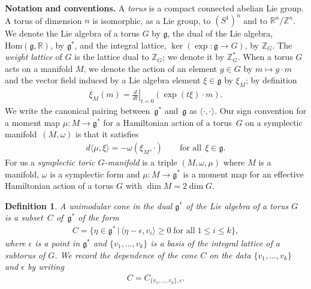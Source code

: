 \documentclass[pdftex]{sigma}
\numberwithin{equation}{section}
\newtheorem{Definition}[Lemma]{Definition}
\begin{document}
\textbf{Notation and conventions.}
A \emph{torus} is a compact connected abelian Lie group.  A torus
of dimension $n$ is isomorphic, as a Lie group, to $(S^1)^n$
and to ${\mathbb R}^n/{\mathbb Z}^n$.  We denote the Lie algebra of a torus $G$ by ${\mathfrak g}$,
the dual of the Lie algebra, $\text{Hom}({\mathfrak g},{\mathbb R})$, by ${\mathfrak g}^*$, and
the integral lattice, $\ker (\exp \colon {\mathfrak g} \to G)$, by ${\mathbb Z}_G$.
The \emph{weight lattice} of $G$ is the lattice dual to ${\mathbb Z}_G$;
we denote it by ${\mathbb Z}_G^*$.
When a torus $G$ acts on a manifold $M$, we denote the action
of an element $g \in G$ by $m \mapsto g \cdot m$ and the vector f\/ield
induced by a Lie algebra element $\xi \in {\mathfrak g}$ by $\xi_M$; by
def\/inition
\begin{gather*}
\xi_M (m) = \left. \frac{d}{dt}\right|_{t=0} (\exp
(t\xi)\cdot m).
\end{gather*}
We write the canonical pairing between~${\mathfrak g}^*$ and~${\mathfrak g}$
as $\langle \cdot, \cdot\rangle$.  Our sign convention for a moment
map $\mu \colon M \to {\mathfrak g}^*$ for a Hamiltonian action of a torus~$G$
on a symplectic manifold~$(M, \omega)$ is that it satisf\/ies
\begin{gather} \label{eq:moment_map}
d \langle \mu, \xi \rangle = - \omega (\xi_M, \cdot) \qquad \textrm{for all} \ \ \xi \in {\mathfrak g}.
\end{gather}
For us a \emph{symplectic toric $G$-manifold} is a triple $(M,\omega, \mu)$
where $M$ is a manifold, $\omega$ is a symplectic form and
$\mu\colon M\to{\mathfrak g}^*$ is a moment map for an ef\/fective Hamiltonian action of
a torus $G$ with $\dim M = 2 \dim G$.



\begin{Definition} \label{def:unimod_cone}
A \emph{unimodular cone} in the dual ${\mathfrak g}^*$ of the Lie algebra
of a torus $G$ is a subset~$C$ of~${\mathfrak g}^*$ of the form
\begin{gather*} %
C= \big\{ \eta \in {\mathfrak g}^* \,|\, \langle \eta - \epsilon , v_i \rangle \geq 0
\; \text{for all}\; 1 \leq i \leq k\big\},
\end{gather*}
where $\epsilon$ is a point in ${\mathfrak g}^*$ and $\{v_1, \ldots, v_k\}$ is a
basis of the integral lattice of a subtorus of $G$.  We record the
dependence of the cone $C$ on the data $\{v_1,\ldots,v_k\}$ and $\epsilon$ by
writing
\begin{gather*}
C = C_{\{v_1,\ldots,v_k\}, \epsilon}.
\end{gather*}
\end{Definition}
\end{document}

